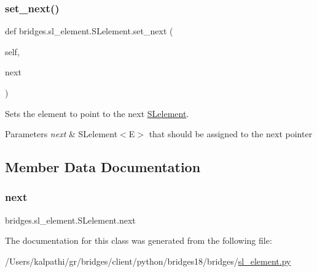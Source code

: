 \subsubsection{\texorpdfstring{set\+\_\+next()}{set\_next()}}
{\footnotesize\ttfamily def bridges.\+sl\+\_\+element.\+S\+Lelement.\+set\+\_\+next (\begin{DoxyParamCaption}\item[{}]{self,  }\item[{}]{next }\end{DoxyParamCaption})}



Sets the element to point to the next \mbox{\hyperlink{classbridges_1_1sl__element_1_1_s_lelement}{S\+Lelement}}. 


\begin{DoxyParams}{Parameters}
{\em next} & S\+Lelement$<$\+E$>$ that should be assigned to the next pointer \\
\hline
\end{DoxyParams}


\subsection{Member Data Documentation}
\mbox{\label{classbridges_1_1sl__element_1_1_s_lelement_a4fa8e9321dd2ce726da047ddc64adabf}} 
\subsubsection{\texorpdfstring{next}{next}}
{\footnotesize\ttfamily bridges.\+sl\+\_\+element.\+S\+Lelement.\+next}



The documentation for this class was generated from the following file\+:\begin{DoxyCompactItemize}
\item 
/\+Users/kalpathi/gr/bridges/client/python/bridges18/bridges/\mbox{\hyperlink{sl__element_8py}{sl\+\_\+element.\+py}}\end{DoxyCompactItemize}
